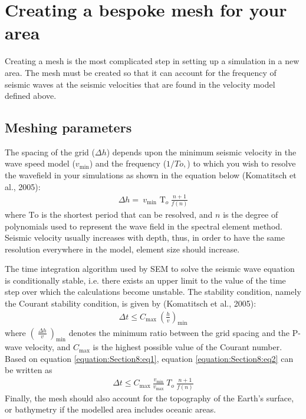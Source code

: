 \documentclass[english]{book}
\begin{document}
\section{Creating a bespoke mesh for your area}
\label{\detokenize{Section8:creating-a-bespoke-mesh-for-your-area}}
Creating a mesh is the most complicated step in setting up a simulation
in a new area. The mesh must be created so that it can account for the
frequency of seismic waves at the seismic velocities that are found in
the velocity model defined above.


\subsection{Meshing parameters}
\label{\detokenize{Section8:meshing-parameters}}
The spacing of the grid (\({\Delta}h\)) depends upon the minimum seismic
velocity in the wave speed model (\(v_{\min}\)) and the frequency
(\(1/To,\)) to which you wish to resolve the wavefield in your
simulations as shown in the equation below (Komatitsch et al., 2005):
\begin{equation}\label{equation:Section8:eq1}
\begin{split}{\Delta}h = \ v_{\min}\text{\ T}_{o}\ \frac{n + 1}{f(n)}\end{split}
\end{equation}
where \(\text{To}\) is the shortest period that can be resolved, and
\(n\) is the degree of polynomials used to represent the wave field
in the spectral element method. Seismic velocity usually increases with
depth, thus, in order to have the same resolution everywhere in the
model, element size should increase.

The time integration algorithm used by SEM to solve the seismic wave
equation is conditionally stable, i.e. there exists an upper limit to
the value of the time step over which the calculations become unstable.
The stability condition, namely the Courant stability condition, is
given by (Komatitsch et al., 2005):
\begin{equation}\label{equation:Section8:eq2}
\begin{split}{\Delta}t \leq C_{\max}\ \left( \frac{h}{v} \right)_{\min}\end{split}
\end{equation}
where \({(\ \frac{{\Delta}h}{v}\ )}_{\min}\) denotes the minimum ratio
between the grid spacing and the P-wave velocity, and \(C_{\max}\)
is the highest possible value of the Courant number. Based on equation
\eqref{equation:Section8:eq1}, equation \eqref{equation:Section8:eq2} can be written as
\begin{equation}\label{equation:Section8:eq3}
\begin{split}{\Delta}t \leq C_{\max}\ \frac{v_{\min}}{v_{\max}}\ T_{o}\ \frac{n + 1}{f(n)}\end{split}
\end{equation}
Finally, the mesh should also account for the topography of the Earth’s
surface, or bathymetry if the modelled area includes oceanic areas.
\end{document}
